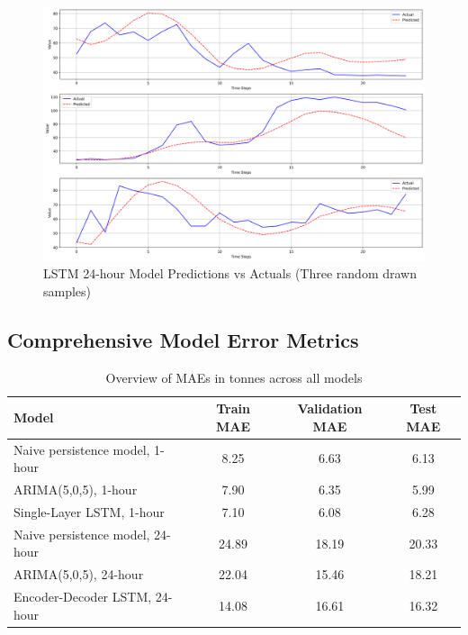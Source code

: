 \begin{figure}[ht]
    \centering
    \includegraphics[width=16cm]{sections/figures/lstm_seq_test_pred_vs_acts.png}
    \caption{LSTM 24-hour Model Predictions vs Actuals (Three random drawn samples)}
    \label{fig:lstm-seq-test-pred-vs-acts}
\end{figure}

\clearpage

\thispagestyle{plain}
\subsection{Comprehensive Model Error Metrics}
\label{apdx:comprehensive-model-error-metrics}

\begin{table}[ht]
    \centering
    \begin{tabular}{lccc}
        \hline
        \textbf{Model}                   & \textbf{Train MAE\phantom{0}} & \textbf{Validation MAE\phantom{0}} & \textbf{Test MAE\phantom{0}} \\ \hline
        Naive persistence model, 1-hour  & \phantom{0}8.25               & \phantom{0}6.63                    & \phantom{0}6.13              \\
        ARIMA(5,0,5), 1-hour             & \phantom{0}7.90               & \phantom{0}6.35                    & \phantom{0}5.99              \\
        Single-Layer LSTM, 1-hour        & \phantom{0}7.10               & \phantom{0}6.08                    & \phantom{0}6.28              \\
        Naive persistence model, 24-hour & 24.89                         & 18.19                              & 20.33                        \\
        ARIMA(5,0,5), 24-hour            & 22.04                         & 15.46                              & 18.21                        \\
        Encoder-Decoder LSTM, 24-hour    & 14.08                         & 16.61                              & 16.32                        \\ \hline
    \end{tabular}
    \caption{Overview of MAEs in tonnes \cotwoe{} across all models}
    \label{tab:overview-maes-across-models}
\end{table}

